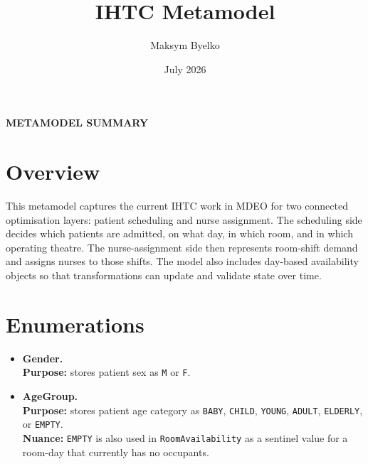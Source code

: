 \documentclass[10pt]{article}
\title{IHTC Metamodel}
\author{Maksym Byelko}
\date{July 2026}
\newcommand{\mainsection}[1]{%
  \begin{center}
    \Large\bfseries #1
  \end{center}
  \vspace{6pt}
}
\newcommand{\clabel}[1]{{\large\bfseries #1}}
\begin{document}
\maketitle
\mainsection{METAMODEL SUMMARY}

\section*{Overview}
This metamodel captures the current IHTC work in MDEO for two connected optimisation layers: patient scheduling and nurse assignment. The scheduling side decides which patients are admitted, on what day, in which room, and in which operating theatre. The nurse-assignment side then represents room-shift demand and assigns nurses to those shifts. The model also includes day-based availability objects so that transformations can update and validate state over time.

\section*{Enumerations}
\begin{itemize}
    \item \clabel{Gender.}\\
    \textbf{Purpose:} stores patient sex as \texttt{M} or \texttt{F}.

    \item \clabel{AgeGroup.}\\
    \textbf{Purpose:} stores patient age category as \texttt{BABY}, \texttt{CHILD}, \texttt{YOUNG}, \texttt{ADULT}, \texttt{ELDERLY}, or \texttt{EMPTY}.\\
    \textbf{Nuance:} \texttt{EMPTY} is also used in \texttt{RoomAvailability} as a sentinel value for a room-day that currently has no occupants.
\end{itemize}
\end{document}
